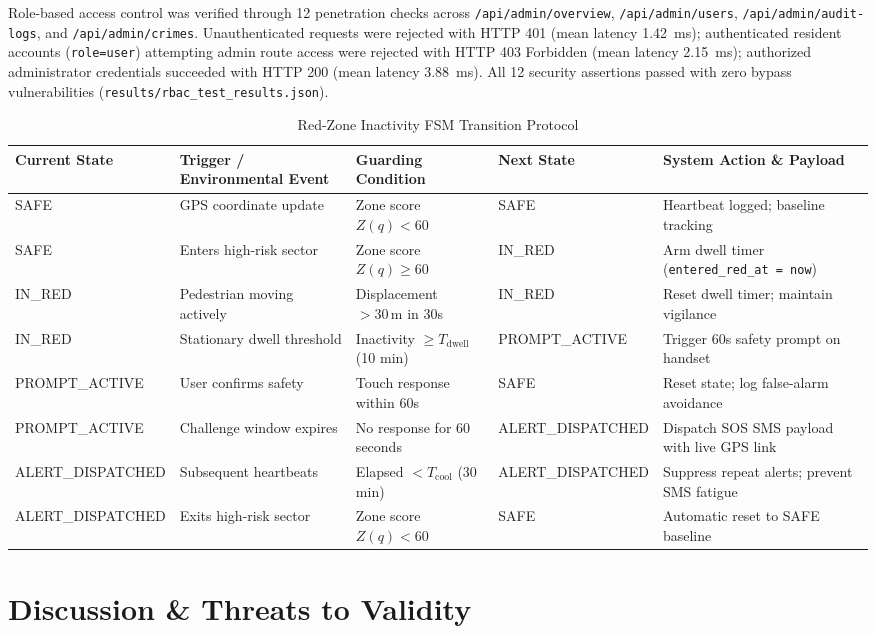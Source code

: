 \documentclass[conference]{IEEEtran}
\begin{document}
Role-based access control was verified through 12 penetration checks across \texttt{/api/admin/overview}, \texttt{/api/admin/users}, \texttt{/api/admin/audit-logs}, and \texttt{/api/admin/crimes}. Unauthenticated requests were rejected with HTTP 401 (mean latency 1.42~ms); authenticated resident accounts (\texttt{role=user}) attempting admin route access were rejected with HTTP 403 Forbidden (mean latency 2.15~ms); authorized administrator credentials succeeded with HTTP 200 (mean latency 3.88~ms). All 12 security assertions passed with zero bypass vulnerabilities (\texttt{results/rbac\_test\_results.json}).

\begin{table}[t]
\centering
\caption{Red-Zone Inactivity FSM Transition Protocol}
\label{tab:fsm}
\begin{tabular}{lllll}
\toprule
\textbf{Current State} & \textbf{Trigger / Environmental Event} & \textbf{Guarding Condition} & \textbf{Next State} & \textbf{System Action \& Payload} \\
\midrule
SAFE & GPS coordinate update & Zone score $Z(q) < 60$ & SAFE & Heartbeat logged; baseline tracking \\
SAFE & Enters high-risk sector & Zone score $Z(q) \ge 60$ & IN\_RED & Arm dwell timer (\texttt{entered\_red\_at = now}) \\
IN\_RED & Pedestrian moving actively & Displacement $> 30\,\text{m}$ in 30s & IN\_RED & Reset dwell timer; maintain vigilance \\
IN\_RED & Stationary dwell threshold & Inactivity $\ge T_{\text{dwell}}$ (10 min) & PROMPT\_ACTIVE & Trigger 60s safety prompt on handset \\
PROMPT\_ACTIVE & User confirms safety & Touch response within 60s & SAFE & Reset state; log false-alarm avoidance \\
PROMPT\_ACTIVE & Challenge window expires & No response for 60 seconds & ALERT\_DISPATCHED & Dispatch SOS SMS payload with live GPS link \\
ALERT\_DISPATCHED & Subsequent heartbeats & Elapsed $< T_{\text{cool}}$ (30 min) & ALERT\_DISPATCHED & Suppress repeat alerts; prevent SMS fatigue \\
ALERT\_DISPATCHED & Exits high-risk sector & Zone score $Z(q) < 60$ & SAFE & Automatic reset to SAFE baseline \\
\bottomrule
\end{tabular}
\end{table}

\section{Discussion \& Threats to Validity}
\end{document}
